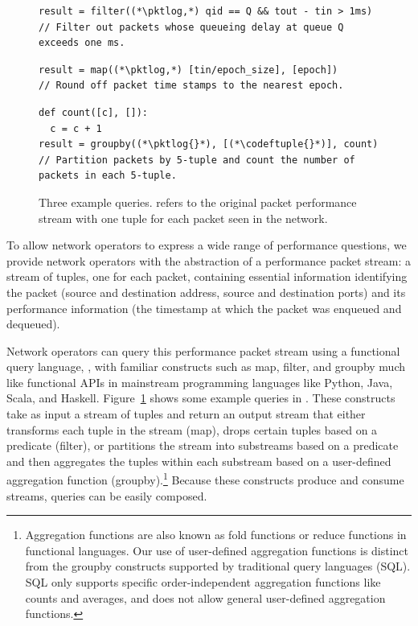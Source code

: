 \begin{figure}
\begin{minipage}[!h]{\textwidth}
\centering
\begin{lstlisting}
result = filter((*\pktlog,*) qid == Q && tout - tin > 1ms)
// Filter out packets whose queueing delay at queue Q exceeds one ms.
\end{lstlisting}
\end{minipage}

\begin{minipage}[!h]{\textwidth}
\centering
\begin{lstlisting}
result = map((*\pktlog,*) [tin/epoch_size], [epoch])
// Round off packet time stamps to the nearest epoch.
\end{lstlisting}
\end{minipage}

\begin{minipage}[!h]{\textwidth}
\begin{lstlisting}
def count([c], []):
  c = c + 1
result = groupby((*\pktlog{}*), [(*\codeftuple{}*)], count)
// Partition packets by 5-tuple and count the number of packets in each 5-tuple.
\end{lstlisting}
\end{minipage}
\caption{Three example \TheSystem queries. {\ct \pktlog{}} refers to the
original packet performance stream with one tuple for each packet seen in the
network.}
\label{fig:example_queries}
\end{figure}

 To allow network operators to express a wide range of
performance questions, we provide network operators with the abstraction of a
performance packet stream: a stream of tuples, one for each packet, containing
essential information identifying the packet (source and destination address,
source and destination ports) and its performance information (the timestamp at
which the packet was enqueued and dequeued).

Network operators can query this performance packet stream using a functional
query language, \TheSystem, with familiar constructs such as {\ct map}, {\ct
filter}, and {\ct groupby} much like functional APIs in mainstream programming
languages like Python, Java, Scala, and Haskell. Figure~\ref{fig:example_queries}
shows some example queries in \TheSystem. These constructs take as input
a stream of tuples and return an output stream that either transforms each
tuple in the stream ({\ct map}), drops certain tuples based on a predicate
({\ct filter}), or partitions the stream into substreams based on a predicate
and then aggregates the tuples within each substream based on a user-defined
aggregation function ({\ct groupby}).\footnote{Aggregation functions are also
known as fold functions or reduce functions in functional languages.  Our use of user-defined aggregation functions is distinct from the
groupby constructs supported by traditional query languages (\eg SQL). SQL only
supports specific order-independent aggregation functions like counts and
averages, and does not allow general user-defined aggregation functions.}
Because these constructs produce and consume streams, \TheSystem queries can be
easily composed.

